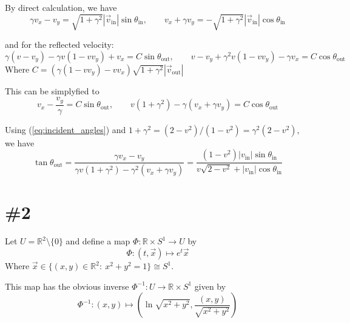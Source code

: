 \documentclass[a4paper,11pt]{article}
\begin{document}
By direct calculation, we have
\begin{equation}
    \gamma v_x - v_y = \sqrt{1 + \gamma^2}|\vec{v}_{\mathrm{in}}|\sin\theta_{\mathrm{in}}, \qquad v_x + \gamma v_y = -\sqrt{1 + \gamma^2}|\vec{v}_{\mathrm{in}}|\cos\theta_{\mathrm{in}} \label{eq:incident_angles}
\end{equation}

and for the reflected velocity:
\begin{equation}
    \gamma(v - v_y) - \gamma v(1 - vv_y) + v_x = C\sin\theta_{\mathrm{out}}, \qquad
    v-v_y + \gamma^2 v(1 - vv_y)-\gamma v_x = C\cos\theta_{\mathrm{out}}
\end{equation}
Where $C=(\gamma(1-vv_y)-vv_x)\sqrt{1 + \gamma^2}|\vec{v}_{\mathrm{out}}|$

This can be simplyfied to
\begin{equation}
    v_x - \frac{v_y}{\gamma} = C\sin\theta_{\mathrm{out}}, \qquad
    v(1 + \gamma^2)-\gamma (v_x+\gamma v_y) = C\cos\theta_{\mathrm{out}}
\end{equation}

Using (\ref{eq:incident_angles}) and $1 +\gamma^2 = (2-v^2)/(1 - v^2)=\gamma^2(2-v^2)$, we have
\begin{equation}
    \tan\theta_{\mathrm{out}} = \frac{\gamma v_x - v_y}{\gamma v (1 + \gamma^2) -\gamma^2(v_x + \gamma v_y)} = \frac{(1-v^2)|v_{\mathrm{in}}|\sin\theta_{\mathrm{in}}}{v\sqrt{2 - v^2}+|v_{\mathrm{in}}|\cos\theta_{\mathrm{in}}}
\end{equation}







 
\section{\#2}

Let $U=\mathbb{R}^2\setminus\{0\}$ and define a map $\Phi:\mathbb{R}\times S^1\to U$ by
\begin{equation}
    \Phi:(t, \vec{x})\mapsto e^t\vec{x}
\end{equation}
Where $\vec{x}\in\{(x, y)\in\mathbb{R}^2:\ x^2+y^2=1\}\cong S^1$.

This map has the obvious inverse $\Phi^{-1}:U\to\mathbb{R}\times S^1$ given by
\begin{equation}
    \Phi^{-1}:(x, y)\mapsto\left(\ln\sqrt{x^2+y^2}, \frac{(x, y)}{\sqrt{x^2+y^2}}\right)
\end{equation}
\end{document}
